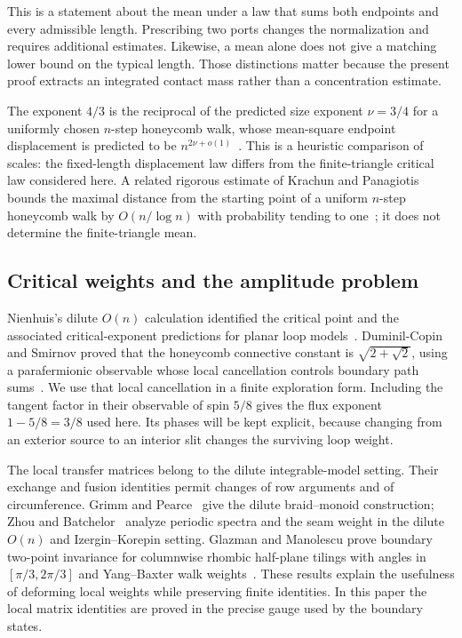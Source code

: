 This is a statement about the mean under a law that sums both endpoints and every admissible length. Prescribing two ports changes the normalization and requires additional estimates. Likewise, a mean alone does not give a matching lower bound on the typical length. Those distinctions matter because the present proof extracts an integrated contact mass rather than a concentration estimate.

The exponent $4/3$ is the reciprocal of the predicted size exponent $\nu=3/4$ for a uniformly chosen $n$-step honeycomb walk, whose mean-square endpoint displacement is predicted to be $n^{2\nu+o(1)}$~\cite{DuminilCopinSmirnov2012}. This is a heuristic comparison of scales: the fixed-length displacement law differs from the finite-triangle critical law considered here. A related rigorous estimate of Krachun and Panagiotis bounds the maximal distance from the starting point of a uniform $n$-step honeycomb walk by $O(n/\log n)$ with probability tending to one~\cite{KrachunPanagiotis2026}; it does not determine the finite-triangle mean.

\subsection{Critical weights and the amplitude problem}

Nienhuis's dilute $O(n)$ calculation identified the critical point and the associated critical-exponent predictions for planar loop models~\cite{Nienhuis1982}. Duminil-Copin and Smirnov proved that the honeycomb connective constant is $\sqrt{2+\sqrt2}$, using a parafermionic observable whose local cancellation controls boundary path sums~\cite{DuminilCopinSmirnov2012}. We use that local cancellation in a finite exploration form. Including the tangent factor in their observable of spin $5/8$ gives the flux exponent $1-5/8=3/8$ used here. Its phases will be kept explicit, because changing from an exterior source to an interior slit changes the surviving loop weight.

The local transfer matrices belong to the dilute integrable-model setting. Their exchange and fusion identities permit changes of row arguments and of circumference. Grimm and Pearce~\cite{GrimmPearce1993} give the dilute braid--monoid construction; Zhou and Batchelor~\cite{ZhouBatchelor1997} analyze periodic spectra and the seam weight in the dilute $O(n)$ and Izergin--Korepin setting. Glazman and Manolescu prove boundary two-point invariance for columnwise rhombic half-plane tilings with angles in $[\pi/3,2\pi/3]$ and Yang--Baxter walk weights~\cite{GlazmanManolescu2017}. These results explain the usefulness of deforming local weights while preserving finite identities. In this paper the local matrix identities are proved in the precise gauge used by the boundary states.

